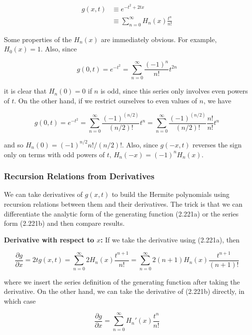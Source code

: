 \documentclass[11pt,a4paper]{article}
\begin{document}
\begin{align}
g(x, t) &\equiv e^{-t^2 + 2tx} \tag{2.221a} \\
&\equiv \sum_{n=0}^{\infty} H_n(x)\frac{t^n}{n!} \tag{2.221b}
\end{align}

Some properties of the $H_n(x)$ are immediately obvious. For example, $H_0(x) = 1$. Also, since

\begin{equation}
g(0, t) = e^{-t^2} = \sum_{n=0}^{\infty}\frac{(-1)^n}{n!}t^{2n}
\tag{2.222}
\end{equation}

it is clear that $H_n(0) = 0$ if $n$ is odd, since this series only involves even powers of $t$. On the other hand, if we restrict ourselves to even values of $n$, we have

\begin{equation}
g(0, t) = e^{-t^2} = \sum_{n=0}^{\infty}\frac{(-1)^{(n/2)}}{(n/2)!}t^n = \sum_{n=0}^{\infty}\frac{(-1)^{(n/2)}}{(n/2)!}\frac{n!}{n!}t^n
\tag{2.223}
\end{equation}

and so $H_n(0) = (-1)^{n/2}n!/(n/2)!$. Also, since $g(-x, t)$ reverses the sign only on terms with odd powers of $t$, $H_n(-x) = (-1)^n H_n(x)$.

\subsubsection{Recursion Relations from Derivatives}

We can take derivatives of $g(x, t)$ to build the Hermite polynomials using recursion relations between them and their derivatives. The trick is that we can differentiate the analytic form of the generating function (2.221a) or the series form (2.221b) and then compare results.

\textbf{Derivative with respect to $x$:}
If we take the derivative using (2.221a), then

\begin{equation}
\frac{\partial g}{\partial x} = 2tg(x, t) = \sum_{n=0}^{\infty}2H_n(x)\frac{t^{n+1}}{n!} = \sum_{n=0}^{\infty}2(n+1)H_n(x)\frac{t^{n+1}}{(n+1)!}
\tag{2.224}
\end{equation}

where we insert the series definition of the generating function after taking the derivative. On the other hand, we can take the derivative of (2.221b) directly, in which case

\begin{equation}
\frac{\partial g}{\partial x} = \sum_{n=0}^{\infty}H_n'(x)\frac{t^n}{n!}
\tag{2.225}
\end{equation}
\end{document}
